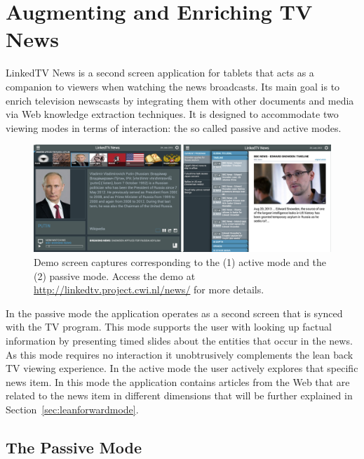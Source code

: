 \documentclass{llncs}
\begin{document}

\section{Augmenting and Enriching TV News}
\label{sec:tvnews}

LinkedTV News is a second screen application for tablets that acts as a companion to viewers when watching the news broadcasts. Its main goal is to enrich television newscasts by integrating them with other documents and media via Web knowledge extraction techniques. It is designed to accommodate two viewing modes in terms of interaction: the so called passive and active modes. 

\begin{figure}[h!]
\centering
\includegraphics[width=1\textwidth]{figure/DemoScreen}
\caption{Demo screen captures corresponding to the (1) active mode and the (2) passive mode. Access the demo at \protect\url{http://linkedtv.project.cwi.nl/news/} for more details.}
\label{fig:namedEntityExpansion}%
\end{figure}

In the passive mode the application operates as a second screen that is synced with the TV program. This mode supports the user with looking up factual information by presenting timed slides about the entities that occur in the news. As this mode requires no interaction it unobtrusively complements the lean back TV viewing experience. In the active mode the user actively explores that specific news item. In this mode the application contains articles from the Web that are related to the news item in different dimensions that will be further explained in Section~\ref{sec:leanforwardmode}.

\subsection{The Passive Mode}
\label{sec:leanbackmode}
\end{document}
